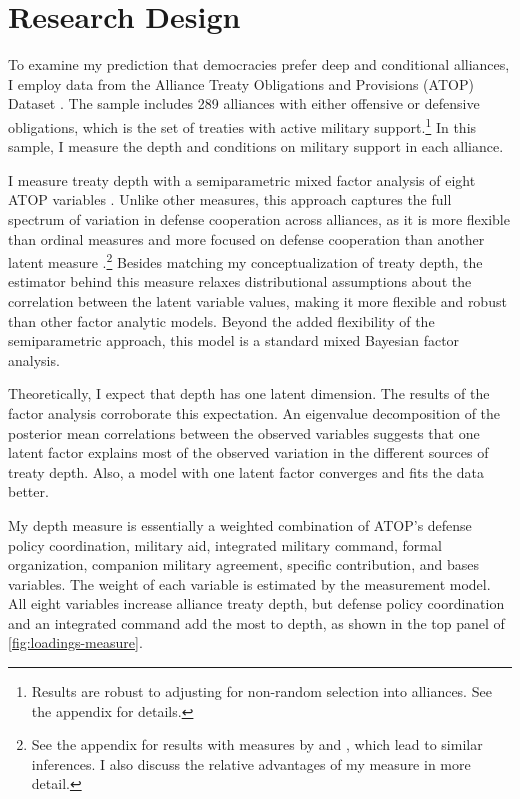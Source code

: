 \documentclass[12pt]{article}
\begin{document}
\section{Research Design}



To examine my prediction that democracies prefer deep and conditional alliances, I employ data from the Alliance Treaty Obligations and Provisions (ATOP) Dataset \citep{Leedsetal2002}. 
The sample includes 289 alliances with either offensive or defensive obligations, which is the set of treaties with active military support.\footnote{Results are robust to adjusting for non-random selection into alliances. See the appendix for details.}
In this sample, I measure the depth and conditions on military support in each alliance. 


I measure treaty depth with a semiparametric mixed factor analysis of eight ATOP variables \citep{Murrayetal2013}.
Unlike other measures, this approach captures the full spectrum of variation in defense cooperation across alliances, as it is more flexible than ordinal measures \citep{LeedsAnac2005} and more focused on defense cooperation than another latent measure \citep{BensonClinton2016}.\footnote{See the appendix for results with measures by \citet{LeedsAnac2005} and \citet{BensonClinton2016}, which lead to similar inferences. I also discuss the relative advantages of my measure in more detail.}
Besides matching my conceptualization of treaty depth, the estimator behind this measure relaxes distributional assumptions about the correlation between the latent variable values, making it more flexible and robust than other factor analytic models. 
Beyond the added flexibility of the semiparametric approach, this model is a standard mixed Bayesian factor analysis. 


Theoretically, I expect that depth has one latent dimension. 
The results of the factor analysis corroborate this expectation.
An eigenvalue decomposition of the posterior mean correlations between the observed variables suggests that one latent factor explains most of the observed variation in the different sources of treaty depth. 
Also, a model with one latent factor converges and fits the data better. 


My depth measure is essentially a weighted combination of ATOP's defense policy coordination, military aid, integrated military command, formal organization, companion military agreement, specific contribution, and bases variables.
The weight of each variable is estimated by the measurement model.  
All eight variables increase alliance treaty depth, but defense policy coordination and an integrated command add the most to depth, as shown in the top panel of \autoref{fig:loadings-measure}. 
\end{document}
